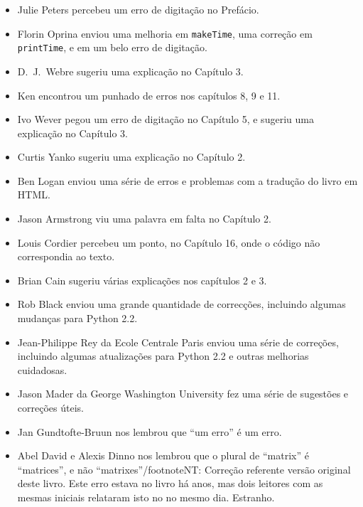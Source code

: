\documentclass[10pt]{book}
\begin{document}
\begin {itemize}
\item Julie Peters percebeu um erro de digitação no Prefácio.

\item Florin Oprina enviou uma melhoria em {\tt makeTime},
uma correção em {\tt printTime}, e em um belo erro de digitação.

\item D.~J.~Webre sugeriu uma explicação no Capítulo 3.

\item Ken encontrou um punhado de erros nos capítulos 8, 9 e 11.

\item Ivo Wever pegou um erro de digitação no Capítulo 5, e sugeriu uma explicação
no Capítulo 3.

\item Curtis Yanko sugeriu uma explicação no Capítulo 2.

\item Ben Logan enviou uma série de erros e problemas com a tradução
do livro em HTML.

\item Jason Armstrong viu uma palavra em falta no Capítulo 2.

\item Louis Cordier percebeu um ponto, no Capítulo 16, onde o código
não correspondia ao texto.

\item Brian Cain sugeriu várias explicações nos capítulos 2 e 3.

\item Rob Black enviou uma grande quantidade de correcções, incluindo algumas
mudanças para Python 2.2.

\item Jean-Philippe Rey da Ecole Centrale
Paris enviou uma série de correções, incluindo algumas atualizações para Python 2.2
e outras melhorias cuidadosas.

\item Jason Mader da George Washington University fez uma série
de sugestões e correções úteis.

\item Jan Gundtofte-Bruun nos lembrou que ``um erro'' é um erro.

\item Abel David e Alexis Dinno nos lembrou que o plural de
``matrix'' é ``matrices'', e não ``matrixes''/footnote{NT: Correção referente versão original deste livro}. Este erro estava no
livro há anos, mas dois leitores com as mesmas iniciais relataram isto no
no mesmo dia. Estranho.


\end{itemize}
\end{document}
